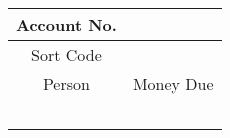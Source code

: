 \documentclass{article}
\begin{document}
\begin{table}
    \begin{tabular}{|c|c|}
        \hline
        \rowcolor{red} Account No. &  \\
        \hline
        \rowcolor{red} Sort Code &  \\
        \hline
        \rowcolor{lightgray} Person & Money Due \\
        \hline
         &  \\
         &  \\
         &  \\
         &  \\
         &  \\
        \hline
    \end{tabular}
\end{table}
\end{document}
